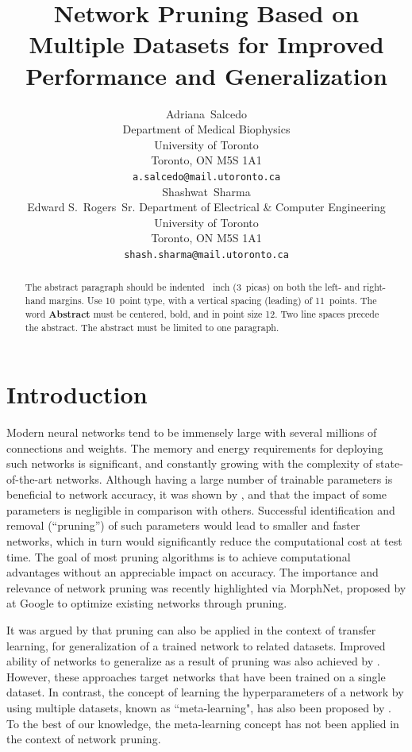 \documentclass{article}
\title{Network Pruning Based on Multiple Datasets for Improved Performance and Generalization}
\author{%
  Adriana~Salcedo\\
  Department of Medical Biophysics\\
  University of Toronto\\
  Toronto, ON M5S 1A1\\
  \texttt{a.salcedo@mail.utoronto.ca} \\
   \And
   Shashwat~Sharma\\
   Edward S.~Rogers~Sr. Department of Electrical \& Computer Engineering \\
   University of Toronto\\
   Toronto, ON M5S 1A1\\
   \texttt{shash.sharma@mail.utoronto.ca} \\
}
\begin{document}

\maketitle

\begin{abstract}
  The abstract paragraph should be indented ~inch (3~picas) on
  both the left- and right-hand margins. Use 10~point type, with a vertical
  spacing (leading) of 11~points.  The word \textbf{Abstract} must be centered,
  bold, and in point size 12. Two line spaces precede the abstract. The abstract
  must be limited to one paragraph.
\end{abstract}

\section{Introduction}

Modern neural networks tend to be immensely large with several millions of connections and weights. The memory and energy requirements for deploying such networks is significant, and constantly growing with the complexity of state-of-the-art networks. Although having a large number of trainable parameters is beneficial to network accuracy, it was shown by \citet{NIPS_learning_weights_pruning}, \citet{OBD} and \citet{OBS} that the impact of some parameters is negligible in comparison with others. Successful identification and removal (``pruning'') of such parameters would lead to smaller and faster networks, which in turn would significantly reduce the computational cost at test time. The goal of most pruning algorithms is to achieve computational advantages without an appreciable impact on accuracy. The importance and relevance of network pruning was recently highlighted via MorphNet, proposed by \citet{morphnet} at Google to optimize existing networks through pruning.

It was argued by \citet{prune_transfer_learning} that pruning can also be applied in the context of transfer learning, for generalization of a trained network to related datasets. Improved ability of networks to generalize as a result of pruning was also achieved by \citet{prune_for_architecture}. However, these approaches target networks that have been trained on a single dataset. In contrast, the concept of learning the hyperparameters of a network by using multiple datasets, known as ``meta-learning", has also been proposed by \citet{metalearning1}. To the best of our knowledge, the meta-learning concept has not been applied in the context of network pruning.
\end{document}
